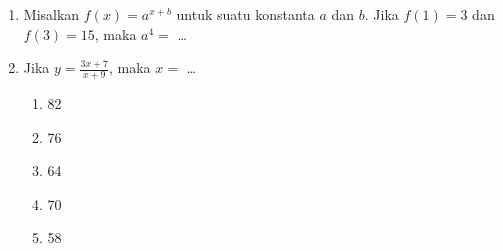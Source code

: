 \documentclass[12pt]{article}
\begin{document}
\begin{enumerate}[label=\textbf{\arabic*.}]
\item Misalkan $f(x) = a^{x+b}$ untuk suatu konstanta $a$ dan $b$. Jika $f(1) = 3$ dan $f(3) = 15$, maka $a^4 =$ \dots

\item Jika $y = \frac{3x + 7}{x + 9}$, maka $x =$ \dots
\begin{enumerate}[label=\alph*.]
    \item 82
    \item 76
    \item 64
    \item 70
    \item 58
\end{enumerate}

\end{enumerate}

\vspace{1cm}
\end{document}
